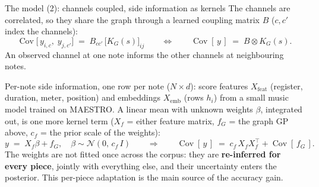 \documentclass[aspectratio=169,11pt]{beamer}
\newcommand{\N}{\mathcal{N}}
\begin{document}
\begin{frame}{The model (2): channels coupled, side information as kernels}
  The channels are correlated, so they share the graph through a learned
  coupling matrix $B$ ($c, c'$ index the channels):
  \vspace{-1mm}
  \begin{equation*}
    \operatorname{Cov}\bigl[\, y_{i,c},\; y_{j,c'} \bigr]
      \;=\; B_{cc'}\, \bigl[K_G(s)\bigr]_{ij}
    \qquad\Longleftrightarrow\qquad
    \operatorname{Cov}[\,y\,] \;=\; B \otimes K_G(s).
  \end{equation*}
  \vspace{-2mm}
  An observed channel at one note informs the other channels at
  neighbouring notes.
  \vspace{2mm}

  Per-note side information, one row per note ($N \times d$): score
  features $X_{\mathrm{feat}}$ (register, duration, meter, position)
  and embeddings $X_{\mathrm{emb}}$ (rows $h_i$) from a small music model
  trained on MAESTRO. A linear mean with unknown weights $\beta$,
  integrated out, is one more kernel term ($X_f$ = either feature matrix,
  $f_G$ = the graph GP above, $c_f$ = the prior scale of the weights):
  \vspace{-1mm}
  \begin{equation*}
    y \;=\; X_f\beta + f_G, \quad \beta \sim \N(0,\, c_f\,I)
    \qquad\Longrightarrow\qquad
    \operatorname{Cov}[\,y\,] \;=\; c_f\, X_f X_f^{\!\top} + \operatorname{Cov}[\,f_G\,].
  \end{equation*}
  {\small The weights are not fitted once across the corpus: they are
  \textbf{re-inferred for every piece}, jointly with everything else,
  and their uncertainty enters the posterior. This per-piece adaptation
  is the main source of the accuracy gain.}
\end{frame}
\end{document}
